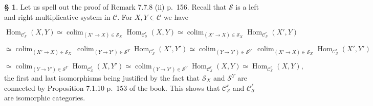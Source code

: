 \documentclass[12pt]{article}
\theoremstyle{remark}
\theoremstyle{definition}
\newtheorem{s}[thm]{\S}
\newcommand{\cc}{\mathcal}
\newcommand{\C}{\mathcal C}
\DeclareMathOperator*{\colim}{colim}
\DeclareMathOperator{\Hom}{Hom}
\begin{document}
%

\begin{s}\label{778}
Let us spell out the proof of Remark 7.7.8 (ii) p.~156. Recall that $\cc S$ is a left and right multiplicative system in $\C$. For $X,Y\in\C$ we have 

$$
\Hom_{\C_{\cc S}^r}(X,Y)\simeq\colim_{(X'\to X)\in\cc S_X}\Hom_{\C_{\cc S}^r}(X,Y)\simeq\colim_{(X'\to X)\in\cc S_X}\Hom_{\C_{\cc S}^r}(X',Y)
$$

$$
\simeq
\colim_{(X'\to X)\in\cc S_X}\ \colim_{(Y\to Y')\in\cc S^Y}\Hom_{\C_{\cc S}^r}(X',Y')\simeq
\colim_{(Y\to Y')\in\cc S^Y}\ \colim_{(X'\to X)\in\cc S_X}\Hom_{\C_{\cc S}^r}(X',Y')
$$

$$
\simeq
\colim_{(Y\to Y')\in\cc S^Y}\Hom_{\C_{\cc S}^\ell}(X,Y')\simeq
\colim_{(Y\to Y')\in\cc S^Y}\Hom_{\C_{\cc S}^\ell}(X,Y)\simeq
\Hom_{\C_{\cc S}^\ell}(X,Y),
$$ 
the first and last isomorphisms being justified by the fact that $\cc S_X$ and $\cc S^Y$ are connected by Proposition 7.1.10 p.~153 of the book. This shows that $\C_{\cc S}^r$ and $\C_{\cc S}^\ell$ are isomorphic categories.
\end{s}

%
\end{document}

